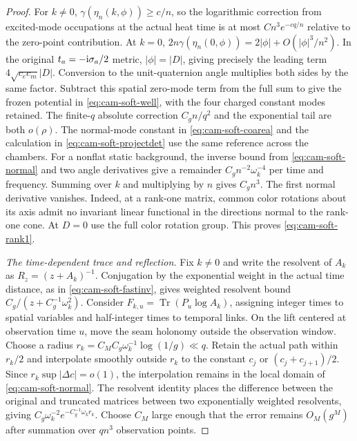 \documentclass[11pt,a4paper]{article}
\numberwithin{equation}{section}
\newcommand{\Tr}{\operatorname{Tr}}
\begin{document}
\begin{proof}
For \(k\ne0\), \(\gamma(\eta_n(k,\phi))\ge c/n\), so the logarithmic correction from excited-mode occupations at the actual heat time is at most \(Cn^3e^{-cq/n}\) relative to the zero-point contribution. At \(k=0\), \(2n\gamma(\eta_n(0,\phi))=2|\phi|+O(|\phi|^3/n^2)\). In the original \(t_a=-{\rm i}\sigma_a/2\) metric, \(|\phi|=|D|\), giving precisely the leading term \(4\sqrt{c_ec_m}|D|\). Conversion to the unit-quaternion angle multiplies both sides by the same factor. Subtract this spatial zero-mode term from the full sum to give the frozen potential in \eqref{eq:cam-soft-well}, with the four charged constant modes retained. The finite-\(q\) absolute correction \(C_g n/q^2\) and the exponential tail are both \(o(\rho)\). The normal-mode constant in \eqref{eq:cam-soft-coarea} and the calculation in \eqref{eq:cam-soft-projectdet} use the same reference across the chambers. For a nonflat static background, the inverse bound from \eqref{eq:cam-soft-normal} and two angle derivatives give a remainder \(C_g n^{-2}\omega_k^{-4}\) per time and frequency. Summing over \(k\) and multiplying by \(n\) gives \(C_gn^3\). The first normal derivative vanishes. Indeed, at a rank-one matrix, common color rotations about its axis admit no invariant linear functional in the directions normal to the rank-one cone. At \(D=0\) use the full color rotation group. This proves \eqref{eq:cam-soft-rank1}.

\emph{The time-dependent trace and reflection.}
Fix \(k\ne0\) and write the resolvent of \(A_k\) as \(R_z=(z+A_k)^{-1}\). Conjugation by the exponential weight in the actual time distance, as in \eqref{eq:cam-soft-fastinv}, gives weighted resolvent bound \(C_g/(z+C_g^{-1}\omega_k^2)\). Consider \(F_{k,u}=\Tr(P_u\log A_k)\), assigning integer times to spatial variables and half-integer times to temporal links. On the lift centered at observation time \(u\), move the seam holonomy outside the observation window. Choose a radius
\(r_k=C_{M}C_g\omega_k^{-1}\log(1/g)\ll q\). Retain the actual path within \(r_k/2\) and interpolate smoothly outside \(r_k\) to the constant \(c_j\) or \((c_j+c_{j+1})/2\). Since
\(r_k\sup|\Delta c|=o(1)\), the interpolation remains in the local domain of \eqref{eq:cam-soft-normal}. The resolvent identity places the difference between the original and truncated matrices between two exponentially weighted resolvents, giving \(C_g\omega_k^{-2}e^{-C_g^{-1}\omega_k r_k}\). Choose \(C_M\) large enough that the error remains \(O_M(g^M)\) after summation over \(q n^3\) observation points.


\end{proof}
\end{document}
